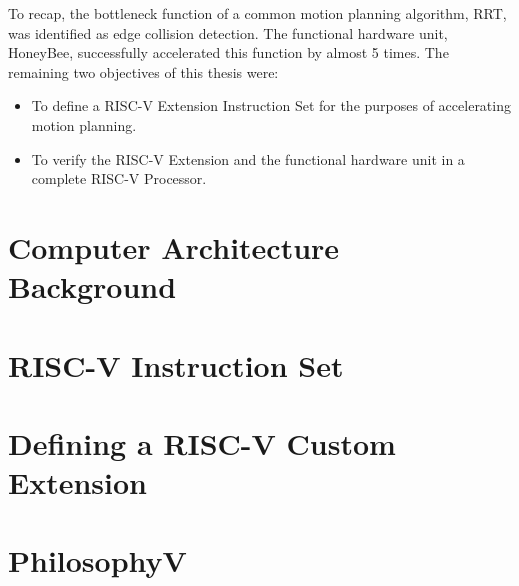 
To recap, the bottleneck function of a common motion planning algorithm, \gls{RRT}, was identified as edge collision detection. The functional hardware unit, HoneyBee, successfully accelerated this function by almost 5 times. The remaining two objectives of this thesis were:
    \begin{itemize}
    \item To define a RISC-V Extension Instruction Set for the purposes of accelerating motion planning.
    \item To verify the RISC-V Extension and the functional hardware unit in a complete RISC-V Processor.
    \end{itemize}

\section{Computer Architecture Background}
    

\newpage
\section{RISC-V Instruction Set}
    

\newpage
\section{Defining a RISC-V Custom Extension}
    

\newpage
\section{PhilosophyV}
    